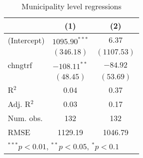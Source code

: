 
\begin{table}
\caption{Municipality level regressions}
\begin{center}
\begin{tabular}{l c c }
\hline
 & (1) & (2) \\
\hline
(Intercept) & $1095.90^{***}$ & $6.37$      \\
            & $(346.18)$      & $(1107.53)$ \\
chngtrf     & $-108.11^{**}$  & $-84.92$    \\
            & $(48.45)$       & $(53.69)$   \\
\hline
R$^2$       & 0.04            & 0.37        \\
Adj. R$^2$  & 0.03            & 0.17        \\
Num. obs.   & 132             & 132         \\
RMSE        & 1129.19         & 1046.79     \\
\hline
\multicolumn{3}{l}{\scriptsize{$^{***}p<0.01$, $^{**}p<0.05$, $^*p<0.1$}}
\end{tabular}
\label{table:coefficients}
\end{center}
\end{table}
